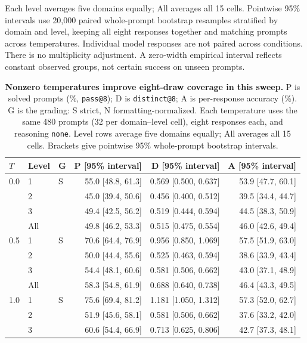 Each level averages five domains equally; All averages all 15 cells.
Pointwise 95\% intervals use 20,000 paired whole-prompt bootstrap
resamples stratified by domain and level, keeping all eight responses
together and matching prompts across temperatures. Individual model
responses are not paired across conditions.
There is no multiplicity adjustment. A zero-width empirical interval
reflects constant observed groups, not certain success on unseen prompts.

\begin{table}[!htbp]
\centering
\setlength{\parfillskip}{0pt plus .20\linewidth}
\caption{\textbf{Nonzero temperatures improve eight-draw coverage in this sweep.}
P is solved prompts (\%, \texttt{pass@8}); D is \texttt{distinct@8};
A is per-response accuracy (\%). G is the grading: S strict,
N formatting-normalized. Each temperature uses the same 480 prompts
(32 per domain--level cell), eight responses each, and reasoning \texttt{none}.
Level rows average five domains equally; All averages all 15 cells.
Brackets give pointwise 95\% whole-prompt bootstrap intervals.}
\label{tab:gpt56-temperature}
\small
\setlength{\tabcolsep}{4pt}
\begin{tabular}{@{}lllrrr@{}}
\toprule
$T$ & Level & G & P [95\% interval] & D [95\% interval] & A [95\% interval] \\
\midrule
0.0 & 1 & S & 55.0 [48.8, 61.3] & 0.569 [0.500, 0.637] & 53.9 [47.7, 60.1] \\
 & 2 &  & 45.0 [39.4, 50.6] & 0.456 [0.400, 0.512] & 39.5 [34.4, 44.7] \\
 & 3 &  & 49.4 [42.5, 56.2] & 0.519 [0.444, 0.594] & 44.5 [38.3, 50.9] \\
 & All &  & 49.8 [46.2, 53.3] & 0.515 [0.475, 0.554] & 46.0 [42.6, 49.4] \\
0.5 & 1 & S & 70.6 [64.4, 76.9] & 0.956 [0.850, 1.069] & 57.5 [51.9, 63.0] \\
 & 2 &  & 50.0 [44.4, 55.6] & 0.525 [0.463, 0.594] & 38.6 [33.9, 43.4] \\
 & 3 &  & 54.4 [48.1, 60.6] & 0.581 [0.506, 0.662] & 43.0 [37.1, 48.9] \\
 & All &  & 58.3 [54.8, 61.9] & 0.688 [0.640, 0.738] & 46.4 [43.3, 49.5] \\
1.0 & 1 & S & 75.6 [69.4, 81.2] & 1.181 [1.050, 1.312] & 57.3 [52.0, 62.7] \\
 & 2 &  & 51.9 [45.6, 58.1] & 0.581 [0.506, 0.662] & 37.6 [33.2, 42.0] \\
 & 3 &  & 60.6 [54.4, 66.9] & 0.713 [0.625, 0.806] & 42.7 [37.3, 48.1] \\

\end{tabular}
\end{table}
